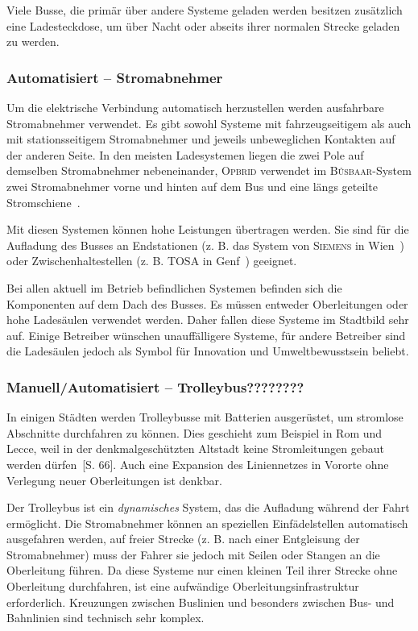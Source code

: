 Viele Busse, die primär über andere Systeme geladen werden besitzen zusätzlich eine Ladesteckdose, um über Nacht oder abseits ihrer normalen Strecke geladen zu werden.

\subsubsection{Automatisiert – Stromabnehmer}
Um die elektrische Verbindung automatisch herzustellen werden ausfahrbare Stromabnehmer verwendet. Es gibt sowohl Systeme mit fahrzeugseitigem als auch mit stationsseitigem Stromabnehmer und jeweils unbeweglichen Kontakten auf der anderen Seite. In den meisten Ladesystemen liegen die zwei Pole auf demselben Stromabnehmer nebeneinander, \textsc{Opbrid} verwendet im \textsc{Bůsbaar}-System zwei Stromabnehmer vorne und hinten auf dem Bus und eine längs geteilte Stromschiene~\cite{SchKonLade}.

Mit diesen Systemen können hohe Leistungen übertragen werden. Sie sind für die Aufladung des Busses an Endstationen (z. B. das System von \textsc{Siemens} in Wien~\cite{SiemensWien}) oder Zwischenhaltestellen (z. B. \textsc{TOSA} in Genf~\cite{tosa}) geeignet. 

Bei allen aktuell im Betrieb befindlichen Systemen befinden sich die Komponenten auf dem Dach des Busses. Es müssen entweder Oberleitungen oder hohe Ladesäulen verwendet werden. Daher fallen diese Systeme im Stadtbild sehr auf. Einige Betreiber wünschen unauffälligere Systeme, für andere Betreiber sind die Ladesäulen jedoch als Symbol für Innovation und Umweltbewusstsein beliebt.

\subsubsection{Manuell/Automatisiert – Trolleybus????????} 
In einigen Städten werden Trolleybusse mit Batterien ausgerüstet, um stromlose Abschnitte durchfahren zu können. Dies geschieht zum Beispiel in Rom und Lecce, weil in der denkmalgeschützten Altstadt keine Stromleitungen gebaut werden dürfen~\cite{tub_aleph001746639}[S. 66]. Auch eine Expansion des Liniennetzes in Vororte ohne Verlegung neuer Oberleitungen ist denkbar.

Der Trolleybus ist ein \emph{dynamisches} System, das die Aufladung während der Fahrt ermöglicht. Die Stromabnehmer können an speziellen Einfädelstellen automatisch ausgefahren werden, auf freier Strecke (z. B. nach einer Entgleisung der Stromabnehmer) muss der Fahrer sie jedoch mit Seilen oder Stangen an die Oberleitung führen. Da diese Systeme nur einen kleinen Teil ihrer Strecke ohne Oberleitung durchfahren, ist eine aufwändige Oberleitungsinfrastruktur erforderlich. Kreuzungen zwischen Buslinien und besonders zwischen Bus- und Bahnlinien sind technisch sehr komplex.
                                 
